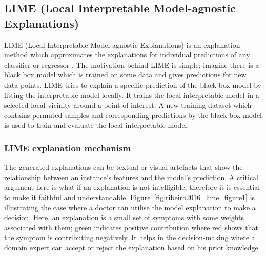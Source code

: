 \documentclass[english]{tktltiki2}
\theoremstyle{definition}
\theoremstyle{remark}
\begin{document}
\subsection{ LIME (Local Interpretable Model-agnostic Explanations)}\label{sec:LIME} %
LIME (Local Interpretable Model-agnostic Explanations) is an explanation method which approximates the explanations for individual predictions of any classifier or regressor \citep{ribeiro2016should}. The motivation behind LIME is simple; imagine there is a black box model which is trained on some data and gives predictions for new data points. LIME tries to explain a specific prediction of the black-box model by fitting the interpretable model locally. It trains the local interpretable model in a selected local vicinity around a point of interest. A new training dataset which contains permuted samples and corresponding predictions by the black-box model is used to train and evaluate the local interpretable model. 

\subsubsection{LIME explanation mechanism} %
The generated explanations can be textual or visual artefacts that show the relationship between an instance's features and the model's prediction. A critical argument here is what if an explanation is not intelligible, therefore it is essential to make it faithful and understandable. Figure~\ref{fig:ribeiro2016_lime_figure1} is illustrating the case where a doctor can utilise the model explanation to make a decision. Here, an explanation is a small set of symptoms with some weights associated with them; green indicates positive contribution where red shows that the symptom is contributing negatively. It helps in the decision-making where a domain expert can accept or reject the explanation based on his prior knowledge.
\end{document}

